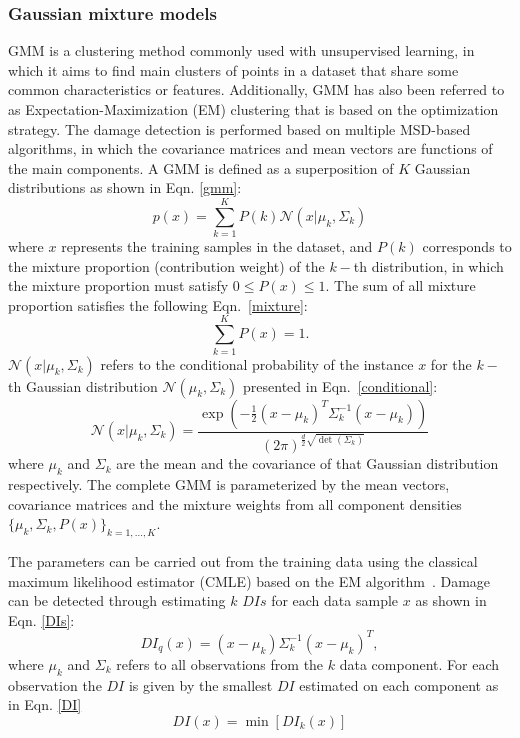 \subsubsection{Gaussian mixture models}
GMM is a clustering method commonly used with unsupervised learning, in which it aims to find main clusters of points in a dataset that share some common characteristics or features.
Additionally, GMM has also been referred to as Expectation-Maximization (EM) clustering that is based on the optimization strategy.
The damage detection is performed based on multiple MSD-based algorithms, in which the covariance matrices and mean vectors are functions of the main components.
A GMM is defined as a superposition of \(K\) Gaussian distributions as shown in Eqn. \ref{gmm}:
\begin{equation}
	p(x) = \sum_{k=1}^K P(k) \mathcal{N}(x|\mu_k,\Sigma_k) 
	\label{gmm}
\end{equation}
where \(x\) represents the training samples in the dataset, and \(P(k)\) corresponds to the mixture proportion (contribution weight) of the \(k-\)th distribution, in which the mixture proportion must satisfy \(0\leq P(x)\leq 1\).
The sum of all mixture proportion satisfies the following Eqn.~\ref{mixture}:
\begin{equation}
	\sum_{k=1}^{K}P(x) =1.
	\label{mixture}
\end{equation}  
\(\mathcal{N}(x|\mu_k,\Sigma_k)\) refers to the conditional probability of the instance \(x\) for the \(k-\)th Gaussian distribution \(\mathcal{N}(\mu_k,\Sigma_k)\) presented in Eqn.~\ref{conditional}:
\begin{equation}
	\mathcal{N}(x|\mu_k,\Sigma_k) = \frac{\exp(-\frac{1}{2}(x-\mu_k)^T\Sigma_k^{-1}(x-\mu_k))}{(2\pi)^{\frac{d}{2}\sqrt{\det(\Sigma_k)}}}
	\label{conditional}		
\end{equation}
where \(\mu_k\) and \(\Sigma_k\) are the mean and the covariance of that Gaussian distribution respectively.
The complete GMM is parameterized by the mean vectors, covariance matrices and the mixture weights from all component densities \(\{\mu_k,\Sigma_k, P(x)\}_{k=1,\hdots,K}\).

The parameters can be carried out from the training data using the classical maximum likelihood estimator (CMLE) based on the EM algorithm~\cite{Dempster1977}.
Damage can be detected through estimating \(k\) \(DIs\) for each data sample \(x\) as shown in Eqn. \ref{DIs}:
\begin{equation}
	DI_q(x) = (x-\mu_k)\Sigma_k^{-1}(x-\mu_k)^T,
	\label{DIs}
\end{equation}
where \(\mu_k\) and \(\Sigma_k\) refers to all observations from the \(k\) data component.
For each observation the \(DI\) is given by the smallest \(DI\) estimated on each component as in Eqn. \ref{DI}
\begin{equation}
	DI(x) = \min[DI_k(x)]
	\label{DI}
\end{equation}
